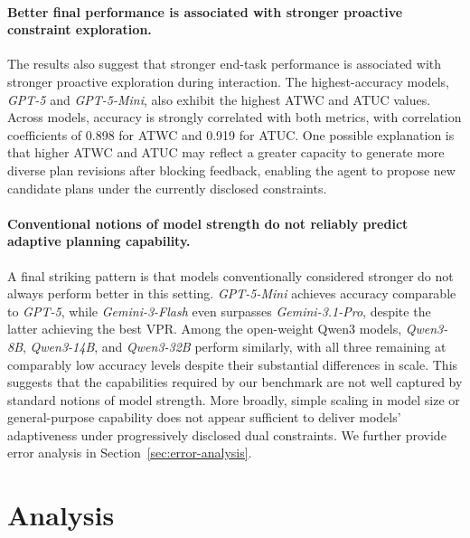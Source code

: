 \documentclass{llmxive}
\begin{document}
\paragraph{Better final performance is associated with stronger proactive constraint exploration.}
The results also suggest that stronger end-task performance is associated with stronger proactive exploration during interaction.
The highest-accuracy models, \textit{GPT-5} and \textit{GPT-5-Mini}, also exhibit the highest ATWC and ATUC values.
Across models, accuracy is strongly correlated with both metrics, with correlation coefficients of 0.898 for ATWC and 0.919 for ATUC.
One possible explanation is that higher ATWC and ATUC may reflect a greater capacity to generate more diverse plan revisions after blocking feedback, enabling the agent to propose new candidate plans under the currently disclosed constraints.

\paragraph{Conventional notions of model strength do not reliably predict adaptive planning capability.}
A final striking pattern is that models conventionally considered stronger do not always perform better in this setting. 
\textit{GPT-5-Mini} achieves accuracy comparable to \textit{GPT-5}, while \textit{Gemini-3-Flash} even surpasses \textit{Gemini-3.1-Pro}, despite the latter achieving the best VPR.
Among the open-weight Qwen3 models, \textit{Qwen3-8B}, \textit{Qwen3-14B}, and \textit{Qwen3-32B} perform similarly, with all three remaining at comparably low accuracy levels despite their substantial differences in scale.
This suggests that the capabilities required by our benchmark are not well captured by standard notions of model strength. 
More broadly, simple scaling in model size or general-purpose capability does not appear sufficient to deliver models' adaptiveness under progressively disclosed dual constraints.
We further provide error analysis in Section~\ref{sec:error-analysis}. 







\section{Analysis}
\label{sec:analysis}
\end{document}
